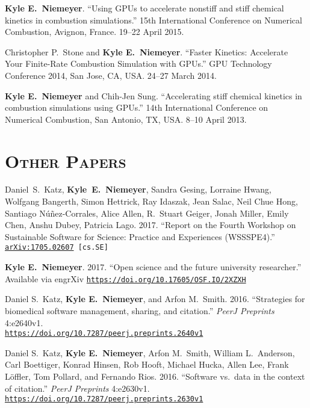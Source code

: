 \documentclass[margin,line,11pt]{res}
\makeatletter
\newlength{\bibhang}
\newlength{\bibsep}
 {\@listi \global\bibsep\itemsep \global\advance\bibsep by\parsep}
\newenvironment{bibenum*}
  {\renewcommand\labelenumi{\theenumi.}%
   \etaremune[
     topsep=0pt,
     itemsep=\bibsep,
     parsep=0pt,partopsep=0pt,
     itemindent=-\bibhang,
     leftmargin={\bibhang+\widthof{[999]}}]}
  {\endetaremune}
\newcommand*{\doi}[1]{\href{https://doi.org/#1}{\nolinkurl{https://doi.org/#1}}}
\makeatother
\begin{document}
\begin{resume}
\begin{bibenum*}
\item \textbf{Kyle E.~Niemeyer}.
``Using GPUs to accelerate nonstiff and stiff chemical kinetics in combustion simulations.''
15th International Conference on Numerical Combustion, Avignon, France.
19--22 April 2015.

\item Christopher P.~Stone and \textbf{Kyle E.~Niemeyer}.
``Faster Kinetics: Accelerate Your Finite-Rate Combustion Simulation with GPUs.''
GPU Technology Conference 2014, San Jose, CA, USA.
24--27 March 2014.

\item \textbf{Kyle E.~Niemeyer} and Chih-Jen Sung.
``Accelerating stiff chemical kinetics in combustion simulations using GPUs.''
14th International Conference on Numerical Combustion, San Antonio, TX, USA.
8--10 April 2013.

\end{bibenum*}

\section{\textsc{Other Papers}}

\begin{bibenum*}

\item Daniel~S.~Katz, \textbf{Kyle~E.~Niemeyer}, Sandra Gesing, Lorraine Hwang,
Wolfgang Bangerth, Simon Hettrick, Ray Idaszak, Jean Salac, Neil Chue Hong,
Santiago N\'u\~nez-Corrales, Alice Allen, R.~Stuart Geiger, Jonah Miller,
Emily Chen, Anshu Dubey, Patricia Lago.
2017.
``Report on the Fourth Workshop on Sustainable Software for Science: Practice and Experiences (WSSSPE4).''
{\tt \href{http://arxiv.org/abs/1705.02607}{arXiv:1705.02607} [cs.SE]}

\item \textbf{Kyle E.~Niemeyer}.
2017.
``Open science and the future university researcher.''
Available via engrXiv \doi{10.17605/OSF.IO/2XZXH}

\item Daniel S.\ Katz, \textbf{Kyle E.~Niemeyer}, and Arfon M.\ Smith.
2016.
``Strategies for biomedical software management, sharing, and citation.''
\textit{PeerJ Preprints} 4:e2640v1. \\
\doi{10.7287/peerj.preprints.2640v1}

\item Daniel S.\ Katz, \textbf{Kyle E.~Niemeyer}, Arfon M.\ Smith, William L.\ Anderson,
Carl Boettiger, Konrad Hinsen, Rob Hooft, Michael Hucka, Allen Lee, Frank Löffler,
Tom Pollard, and Fernando Rios.
2016.
``Software vs.\ data in the context of citation.''
\textit{PeerJ Preprints} 4:e2630v1.
\doi{10.7287/peerj.preprints.2630v1}


\end{bibenum*}
\end{resume}
\end{document}
